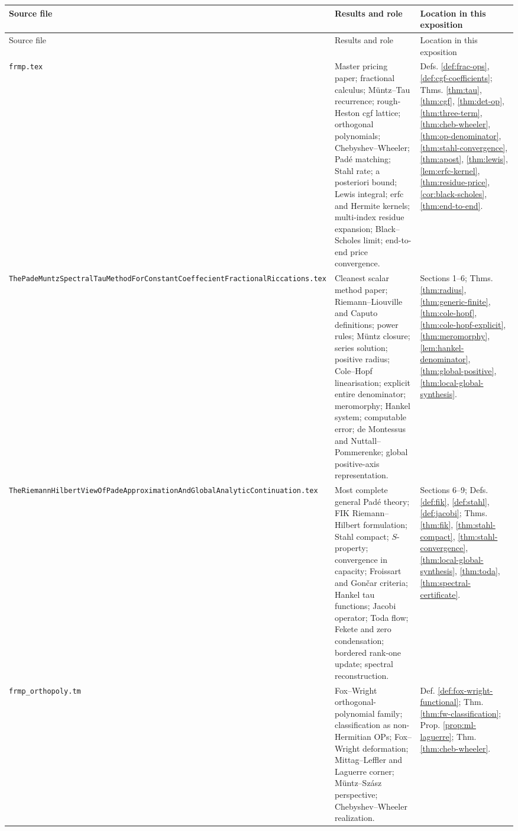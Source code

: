 \documentclass[11pt]{article}
\theoremstyle{definition}
\begin{document}
\begin{longtable}{p{}p{}p{}}
\toprule
Source file & Results and role & Location in this exposition\\
\midrule
\endfirsthead
\toprule
Source file & Results and role & Location in this exposition\\
\midrule
\endhead
\texttt{frmp.tex} & Master pricing paper; fractional calculus; Müntz--Tau recurrence; rough-Heston cgf lattice; orthogonal polynomials; Chebyshev--Wheeler; Padé matching; Stahl rate; a posteriori bound; Lewis integral; erfc and Hermite kernels; multi-index residue expansion; Black--Scholes limit; end-to-end price convergence. & Defs. \ref{def:frac-ops}, \ref{def:cgf-coefficients}; Thms. \ref{thm:tau}, \ref{thm:cgf}, \ref{thm:det-op}, \ref{thm:three-term}, \ref{thm:cheb-wheeler}, \ref{thm:op-denominator}, \ref{thm:stahl-convergence}, \ref{thm:apost}, \ref{thm:lewis}, \ref{lem:erfc-kernel}, \ref{thm:residue-price}, \ref{cor:black-scholes}, \ref{thm:end-to-end}.\\
\texttt{ThePadeMuntzSpectralTauMethodForConstantCoeffecientFractionalRiccations.tex} & Cleanest scalar method paper; Riemann--Liouville and Caputo definitions; power rules; Müntz closure; series solution; positive radius; Cole--Hopf linearisation; explicit entire denominator; meromorphy; Hankel system; computable error; de Montessus and Nuttall--Pommerenke; global positive-axis representation. & Sections 1--6; Thms. \ref{thm:radius}, \ref{thm:generic-finite}, \ref{thm:cole-hopf}, \ref{thm:cole-hopf-explicit}, \ref{thm:meromorphy}, \ref{lem:hankel-denominator}, \ref{thm:global-positive}, \ref{thm:local-global-synthesis}.\\
\texttt{TheRiemannHilbertViewOfPadeApproximationAndGlobalAnalyticContinuation.tex} & Most complete general Padé theory; FIK Riemann--Hilbert formulation; Stahl compact; $S$-property; convergence in capacity; Froissart and Gončar criteria; Hankel tau functions; Jacobi operator; Toda flow; Fekete and zero condensation; bordered rank-one update; spectral reconstruction. & Sections 6--9; Defs. \ref{def:fik}, \ref{def:stahl}, \ref{def:jacobi}; Thms. \ref{thm:fik}, \ref{thm:stahl-compact}, \ref{thm:stahl-convergence}, \ref{thm:local-global-synthesis}, \ref{thm:toda}, \ref{thm:spectral-certificate}.\\
\texttt{frmp\_orthopoly.tm} & Fox--Wright orthogonal-polynomial family; classification as non-Hermitian OPs; Fox--Wright deformation; Mittag--Leffler and Laguerre corner; Müntz--Szász perspective; Chebyshev--Wheeler realization. & Def. \ref{def:fox-wright-functional}; Thm. \ref{thm:fw-classification}; Prop. \ref{prop:ml-laguerre}; Thm. \ref{thm:cheb-wheeler}.\\

\end{longtable}
\end{document}
